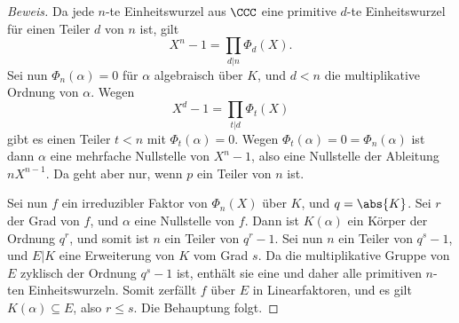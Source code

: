 \documentclass[12pt,a4paper,twoside]{article}
\begin{document}
\begin{proof}[Beweis]
  Da jede $n$-te Einheitswurzel aus $\CCC$ eine primitive $d$-te
  Einheitswurzel f\"ur einen Teiler $d$ von $n$ ist, gilt
\[
X^n-1=\prod_{d|n}\Phi_d(X).
\]
Sei nun $\Phi_n(\alpha)=0$ f\"ur $\alpha$ algebraisch \"uber $K$, und $d<n$
die multiplikative Ordnung von $\alpha$. Wegen
\[
X^d-1=\prod_{t|d}\Phi_t(X)
\]
gibt es einen Teiler $t<n$ mit $\Phi_t(\alpha)=0$. Wegen
$\Phi_t(\alpha)=0=\Phi_n(\alpha)$ ist dann $\alpha$ eine mehrfache Nullstelle
von $X^n-1$, also eine Nullstelle der Ableitung $nX^{n-1}$. Da geht aber nur,
wenn $p$ ein Teiler von $n$ ist.

Sei nun $f$ ein irreduzibler Faktor von $\Phi_n(X)$ \"uber $K$, und
$q=\abs{K}$. Sei $r$ der Grad von $f$, und $\alpha$ eine Nullstelle von $f$.
Dann ist $K(\alpha)$ ein K\"orper der Ordnung $q^r$, und somit ist $n$ ein
Teiler von $q^r-1$. Sei nun $n$ ein Teiler von $q^s-1$, und $E|K$ eine
Erweiterung von $K$ vom Grad $s$. Da die multiplikative Gruppe von $E$
zyklisch der Ordnung $q^s-1$ ist, enth\"alt sie eine und daher alle primitiven
$n$-ten Einheitswurzeln. Somit zerf\"allt $f$ \"uber $E$ in Linearfaktoren,
und es gilt $K(\alpha)\subseteq E$, also $r\le s$. Die Behauptung folgt.
\end{proof}
\end{document}
